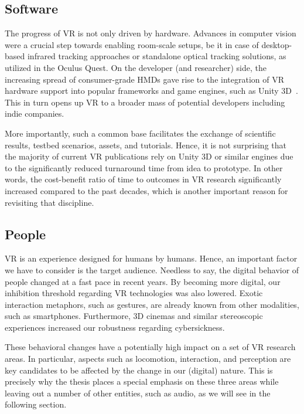 \subsection{Software}

The progress of VR is not only driven by hardware. Advances in computer vision were a crucial step towards enabling room-scale setups, be it in case of desktop-based infrared tracking approaches or standalone optical tracking solutions, as utilized in the Oculus Quest. On the developer (and researcher) side, the increasing spread of consumer-grade HMDs gave rise to the integration of VR hardware support into popular frameworks and game engines, such as Unity 3D~\cite{unity}. This in turn opens up VR to a broader mass of potential developers including indie companies. 

More importantly, such a common base facilitates the exchange of scientific results, testbed scenarios, assets, and tutorials. Hence, it is not surprising that the majority of current VR publications rely on Unity 3D or similar engines due to the significantly reduced turnaround time from idea to prototype. In other words, the cost-benefit ratio of time to outcomes in VR research significantly increased compared to the past decades, which is another important reason for revisiting that discipline.



\subsection{People}

VR is an experience designed for humans by humans. Hence, an important factor we have to consider is the target audience. Needless to say, the digital behavior of people changed at a fast pace in recent years. By becoming more digital, our inhibition threshold regarding VR technologies was also lowered. Exotic interaction metaphors, such as gestures, are already known from other modalities, such as smartphones. Furthermore, 3D cinemas and similar stereoscopic experiences increased our robustness regarding cybersickness.

These behavioral changes have a potentially high impact on a set of VR research areas. In particular, aspects such as locomotion, interaction, and perception are key candidates to be affected by the change in our (digital) nature. This is precisely why the thesis places a special emphasis on these three areas while leaving out a number of other entities, such as audio, as we will see in the following section.



